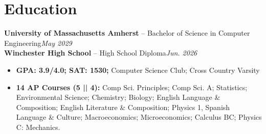 \documentclass[11pt]{article}       %
\begin{document}
\vspace{-15pt}
\section*{Education}
\vspace{3pt}
\textbf{University of Massachusetts Amherst} -- Bachelor of Science in Computer Engineering\hfill \textit{May 2029} \\
\vspace{5pt}
\textbf{Winchester High School} -- High School Diploma\hfill \textit{Jun. 2026} \\
\vspace{-5pt}
\begin{itemize}
  \item \textbf{GPA: 3.9/4.0; SAT: 1530;} Computer Science Club; Cross Country Varsity
  \item \textbf{14 AP Courses (5 || 4):} Comp Sci. Principles; Comp Sci. A; Statistics; Environmental Science; Chemistry; Biology; English Language \& Composition; English Literature \& Composition; Physics 1, Spanish Language \& Culture; Macroeconomics; Microeconomics; Calculus BC; Physics C: Mechanics.
\end{itemize}

\vspace{5pt}
\end{document}
